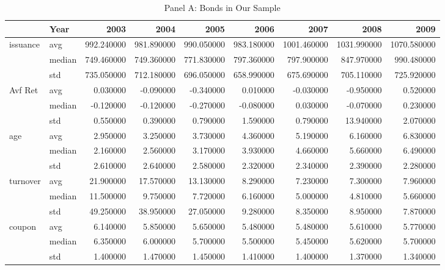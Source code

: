 \documentclass{article}
\begin{document}
\begin{landscape}

\begin{table}[ht]
\centering
\caption{Panel A: Bonds in Our Sample}

\begin{tabular}{llrrrrrrr}
\toprule
 & Year & 2003 & 2004 & 2005 & 2006 & 2007 & 2008 & 2009 \\
\midrule
\multirow[t]{3}{*}{issuance} & avg & 992.240000 & 981.890000 & 990.050000 & 983.180000 & 1001.460000 & 1031.990000 & 1070.580000 \\
 & median & 749.460000 & 749.360000 & 771.830000 & 797.360000 & 797.900000 & 847.970000 & 990.480000 \\
 & std & 735.050000 & 712.180000 & 696.050000 & 658.990000 & 675.690000 & 705.110000 & 725.920000 \\
\cline{1-9}
\multirow[t]{3}{*}{Avf Ret} & avg & 0.030000 & -0.090000 & -0.340000 & 0.010000 & -0.030000 & -0.950000 & 0.520000 \\
 & median & -0.120000 & -0.120000 & -0.270000 & -0.080000 & 0.030000 & -0.070000 & 0.230000 \\
 & std & 0.550000 & 0.390000 & 0.790000 & 1.590000 & 0.790000 & 13.940000 & 2.070000 \\
\cline{1-9}
\multirow[t]{3}{*}{age} & avg & 2.950000 & 3.250000 & 3.730000 & 4.360000 & 5.190000 & 6.160000 & 6.830000 \\
 & median & 2.160000 & 2.560000 & 3.170000 & 3.930000 & 4.660000 & 5.660000 & 6.490000 \\
 & std & 2.610000 & 2.640000 & 2.580000 & 2.320000 & 2.340000 & 2.390000 & 2.280000 \\
\cline{1-9}
\multirow[t]{3}{*}{turnover} & avg & 21.900000 & 17.570000 & 13.130000 & 8.290000 & 7.230000 & 7.300000 & 7.960000 \\
 & median & 11.500000 & 9.750000 & 7.720000 & 6.160000 & 5.000000 & 4.810000 & 5.660000 \\
 & std & 49.250000 & 38.950000 & 27.050000 & 9.280000 & 8.350000 & 8.950000 & 7.870000 \\
\cline{1-9}
\multirow[t]{3}{*}{coupon} & avg & 6.140000 & 5.850000 & 5.650000 & 5.480000 & 5.480000 & 5.610000 & 5.770000 \\
 & median & 6.350000 & 6.000000 & 5.700000 & 5.500000 & 5.450000 & 5.620000 & 5.700000 \\
 & std & 1.400000 & 1.470000 & 1.450000 & 1.410000 & 1.400000 & 1.370000 & 1.340000 \\
\cline{1-9}

\end{tabular}
\end{table}
\end{landscape}
\end{document}
